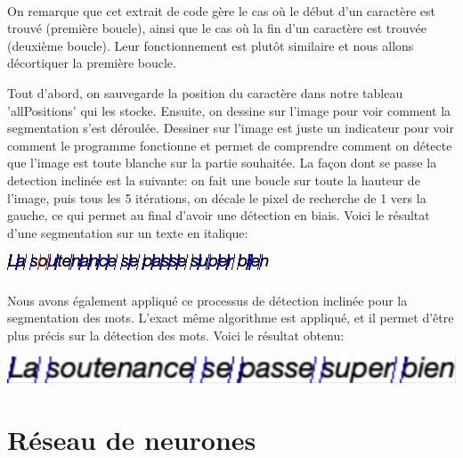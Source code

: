 \documentclass{article}
\begin{document}
    \paragraph{}
    On remarque que cet extrait de code gère le cas où le début d'un caractère est trouvé (première boucle), ainsi que le cas où la fin d'un caractère est trouvée (deuxième boucle). Leur fonctionnement est plutôt similaire et nous allons décortiquer la première boucle.
    \par Tout d'abord, on sauvegarde la position du caractère dans notre tableau 'allPositions' qui les stocke. Ensuite, on dessine sur l'image pour voir comment la segmentation s'est déroulée. Dessiner sur l'image est juste un indicateur pour voir comment le programme fonctionne et permet de comprendre comment on détecte que l'image est toute blanche sur la partie souhaitée. La façon dont se passe la detection inclinée est la suivante: on fait une boucle sur toute la hauteur de l'image, puis tous les 5 itérations, on décale le pixel de recherche de 1 vers la gauche, ce qui permet au final d'avoir une détection en biais. Voici le résultat d'une segmentation sur un texte en italique: \\

    \begin{center}
		\includegraphics[scale=1]{italicChars}
	\end{center}

    \paragraph{}
    Nous avons également appliqué ce processus de détection inclinée pour la segmentation des mots. L'exact même algorithme est appliqué, et il permet d'être plus précis sur la détection des mots. Voici le résultat obtenu: \\

    \begin{center}
		\includegraphics[scale=0.26]{wordItalic}
	\end{center}
	
\newpage

\section{Réseau de neurones}
\end{document}
